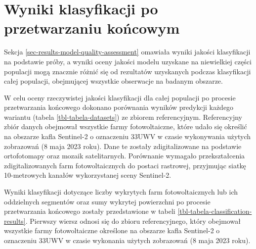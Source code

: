 \documentclass{amuthesis}
\begin{document}
\hypertarget{sec-classification-results}{%
\section{Wyniki klasyfikacji po przetwarzaniu
końcowym}\label{sec-classification-results}}

Sekcja \ref{sec-results-model-quality-assessment} omawiała wyniki
jakości klasyfikacji na podstawie próby, a wyniki oceny jakości modelu
uzyskane na niewielkiej części populacji mogą znacznie różnić się od
rezultatów uzyskanych podczas klasyfikacji całej populacji, obejmującej
wszystkie obserwacje na badanym obszarze.

W celu oceny rzeczywistej jakości klasyfikacji dla całej populacji po
procesie przetwarzania końcowego dokonano porównania wyników predykcji
każdego wariantu (tabela \ref{tbl-tabela-datasets}) ze zbiorem
referencyjnym. Referencyjny zbiór danych obejmował wszystkie farmy
fotowoltaiczne, które udało się określić na obszarze kafla Sentinel-2 o
oznaczeniu 33UWV w czasie wykonywania użytych zobrazowań (8 maja 2023
roku). Dane te zostały zdigitalizowane na podstawie ortofotomapy oraz
mozaik satelitarnych. Porównanie wymagało przekształcenia
zdigitalizowanych farm fotowoltaicznych do postaci rastrowej, przyjmując
siatkę 10-metrowych kanałów wykorzystanej sceny Sentinel-2.

Wyniki klasyfikacji dotyczące liczby wykrytych farm fotowoltaicznych lub
ich oddzielnych segmentów oraz sumy wykrytej powierzchni po procesie
przetwarzania końcowego zostały przedstawione w tabeli
\ref{tbl-tabela-classification-results}. Pierwszy wiersz odnosi się do
zbioru referencyjnego, który obejmował wszystkie farmy fotowoltaiczne
określone na obszarze kafla Sentinel-2 o oznaczeniu 33UWV w czasie
wykonania użytych zobrazowań (8 maja 2023 roku).
\end{document}
